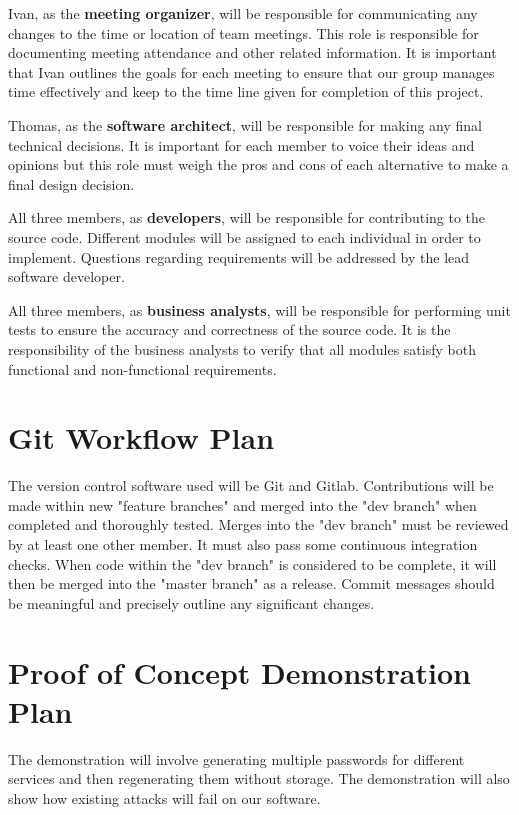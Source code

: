 \documentclass[12pt]{article}
\begin{document}
\begin{flushleft}
Ivan, as the \textbf{meeting organizer}, will be responsible for communicating any changes to the time or location of team meetings. This role is responsible for documenting meeting attendance and other related information. It is important that Ivan outlines the goals for each meeting to ensure that our group manages time effectively and keep to the time line given for completion of this project. \newline

Thomas, as the \textbf{software architect}, will be responsible for making any final technical decisions. It is important for each member to voice their ideas and opinions but this role must weigh the pros and cons of each alternative to make a final design decision. \newline

All three members, as \textbf{developers}, will be responsible for contributing to the source code. Different modules will be assigned to each individual in order to implement. Questions regarding requirements will be addressed by the lead software developer.
\newline

All three members, as \textbf{business analysts}, will be responsible for performing unit tests to ensure the accuracy and correctness of the source code. It is the responsibility of the business analysts to verify that all modules satisfy both functional and non-functional requirements.

\section{Git Workflow Plan}
The version control software used will be Git and Gitlab. Contributions will be made within new "feature branches" and merged into the "dev branch" when completed and thoroughly tested. Merges into the "dev branch" must be reviewed by at least one other member. It must also pass some continuous integration checks. When code within the "dev branch" is considered to be complete, it will then be merged into the "master branch" as a release. Commit messages should be meaningful and precisely outline any significant changes.

\section{Proof of Concept Demonstration Plan}
The demonstration will involve generating multiple passwords for different services and then regenerating them without storage. The demonstration will also show how existing attacks will fail on our software.


\end{flushleft}
\end{document}
